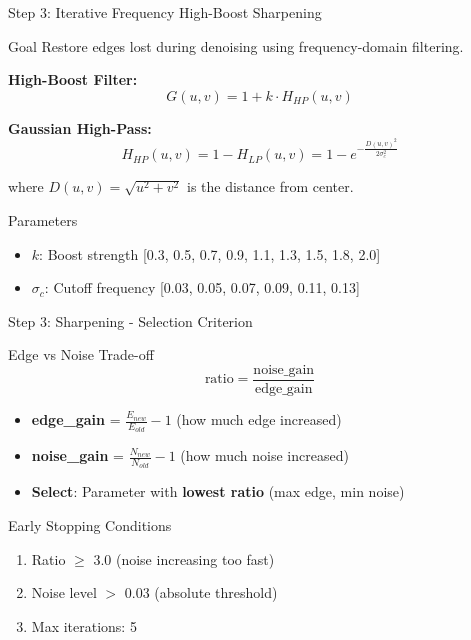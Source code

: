 \documentclass[aspectratio=169]{beamer}
\begin{document}
\begin{frame}{Step 3: Iterative Frequency High-Boost Sharpening}
    \begin{block}{Goal}
        Restore edges lost during denoising using frequency-domain filtering.
    \end{block}
    
    \textbf{High-Boost Filter:}
    \begin{equation}
        G(u,v) = 1 + k \cdot H_{HP}(u,v)
    \end{equation}
    
    \textbf{Gaussian High-Pass:}
    \begin{equation}
        H_{HP}(u,v) = 1 - H_{LP}(u,v) = 1 - e^{-\frac{D(u,v)^2}{2\sigma_c^2}}
    \end{equation}
    
    where $D(u,v) = \sqrt{u^2 + v^2}$ is the distance from center.
    
    \begin{block}{Parameters}
        \begin{itemize}
            \item $k$: Boost strength [0.3, 0.5, 0.7, 0.9, 1.1, 1.3, 1.5, 1.8, 2.0]
            \item $\sigma_c$: Cutoff frequency [0.03, 0.05, 0.07, 0.09, 0.11, 0.13]
        \end{itemize}
    \end{block}
\end{frame}

\begin{frame}{Step 3: Sharpening - Selection Criterion}
    \begin{block}{Edge vs Noise Trade-off}
        \begin{equation}
            \text{ratio} = \frac{\text{noise\_gain}}{\text{edge\_gain}}
        \end{equation}
        
        \begin{itemize}
            \item \textbf{edge\_gain} = $\frac{E_{new}}{E_{old}} - 1$ (how much edge increased)
            \item \textbf{noise\_gain} = $\frac{N_{new}}{N_{old}} - 1$ (how much noise increased)
            \item \textbf{Select}: Parameter with \textbf{lowest ratio} (max edge, min noise)
        \end{itemize}
    \end{block}
    
    \begin{alertblock}{Early Stopping Conditions}
        \begin{enumerate}
            \item Ratio $\geq$ 3.0 (noise increasing too fast)
            \item Noise level $>$ 0.03 (absolute threshold)
            \item Max iterations: 5
        \end{enumerate}
    \end{alertblock}
\end{frame}
\end{document}
